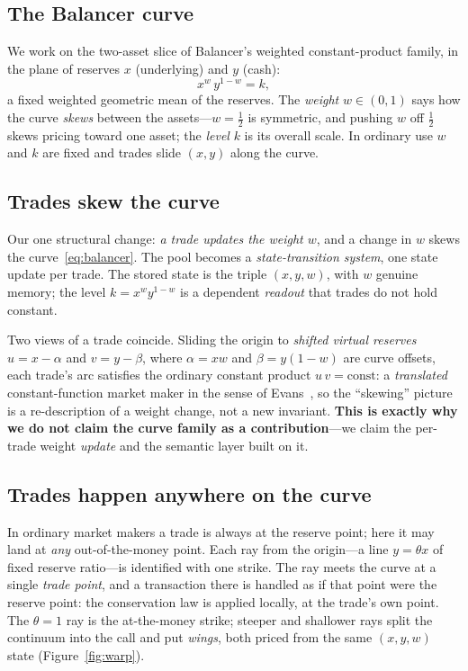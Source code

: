 \documentclass[runningheads]{llncs}
\begin{document}
\subsection{The Balancer curve}
We work on the two-asset slice of Balancer's weighted constant-product family,
in the plane of reserves $x$ (underlying) and $y$ (cash):
\begin{equation}
  x^{w}\,y^{1-w}=k ,
  \label{eq:balancer}
\end{equation}
a fixed weighted geometric mean of the reserves. The \emph{weight} $w\in(0,1)$
says how the curve \emph{skews} between the assets---$w=\tfrac12$ is symmetric,
and pushing $w$ off $\tfrac12$ skews pricing toward one asset; the \emph{level}
$k$ is its overall scale. In ordinary use $w$ and $k$ are fixed and trades slide
$(x,y)$ along the curve.

\subsection{Trades skew the curve}
Our one structural change: \emph{a trade updates the weight $w$}, and a change in
$w$ skews the curve~\eqref{eq:balancer}. The pool becomes a
\emph{state-transition system}, one state update per trade. The stored state is
the triple $(x,y,w)$, with $w$ genuine memory; the level $k=x^{w}y^{1-w}$ is a
dependent \emph{readout} that trades do not hold constant.

Two views of a trade coincide. Sliding the origin to \emph{shifted virtual
reserves} $u=x-\alpha$ and $v=y-\beta$, where $\alpha=xw$ and $\beta=y(1-w)$ are
curve offsets, each trade's arc satisfies the ordinary constant product
$u\,v=\text{const}$: a \emph{translated} constant-function market maker in the
sense of Evans~\cite{evans2020}, so the ``skewing'' picture is a re-description of
a weight change, not a new invariant. \textbf{This is exactly why we do not claim
the curve family as a contribution}---we claim the per-trade weight \emph{update}
and the semantic layer built on it.

\subsection{Trades happen anywhere on the curve}
In ordinary market makers a trade is always at the reserve point; here it may land
at \emph{any} out-of-the-money point. Each ray from the origin---a line
$y=\theta x$ of fixed reserve ratio---is identified with one strike. The ray meets
the curve at a single \emph{trade point}, and a transaction there is handled as if
that point were the reserve point: the conservation law is applied locally, at the
trade's own point. The $\theta=1$ ray is the at-the-money strike; steeper and
shallower rays split the continuum into the call and put \emph{wings}, both priced
from the same $(x,y,w)$ state (Figure~\ref{fig:warp}).
\end{document}
